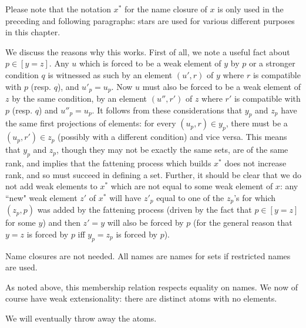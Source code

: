 \documentclass[12pt]{book}
\begin{document}
\begin{description}
Please note that the notation $x^*$ for the name closure of $x$ is only used in the preceding and following paragraphs:  stars are used for various different purposes in this chapter.

We discuss the reasons why this works.  First of all, we note a useful fact about $p \in [y=z]$.  Any $u$ which is forced to be a weak element of
$y$ by $p$ or a stronger condition $q$ is witnessed as such by an element $(u',r)$ of $y$ where $r$ is compatible with $p$ (resp. $q$),
and $u'_p=u_p$.  Now $u$ must also be forced to be a weak element of $z$ by the same condition, by an element $(u'',r')$ of $z$ where
$r'$ is compatible with $p$ (resp. $q$) and $u''_p = u_p$.  It follows from these considerations that $y_p$ and $z_p$ have the same first projections of elements:  for every $(u_p,r) \in y_p$, there must be a $(u_p,r') \in z_p$ (possibly with a different condition) and vice versa.  This means that
$y_p$ and $z_p$, though they may not be exactly the same sets, are of the same rank, and implies that the fattening process which builds $x^*$
does not increase rank, and so must succeed in defining a set.  Further, it should be clear that we do not add weak elements to $x^*$ which are not equal to some weak element of $x$:  any ``new" weak element $z'$ of $x^*$ will have $z'_p$ equal to one of the $z_p$'s for which $(z_p,p)$
was added by the fattening process (driven by the fact that $p \in [y=z]$ for some $y$) and then $z'=y$ will also be forced by $p$ (for the general reason that $y=z$ is forced by $p$ iff $y_p=z_p$ is forced by $p$).

  Name closures are not needed.  All names are names for sets if restricted names are used.

\end{description}


As noted above, this membership relation respects equality on names.  We now of course have weak extensionality:  there are distinct atoms
with no elements.

We will eventually throw away the atoms.
\end{document}
